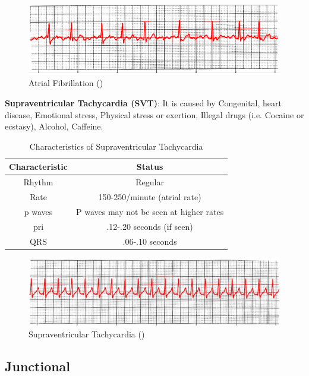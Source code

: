  \begin{figure}[H]
\centering
\includegraphics[scale=0.8]{img/AF.png}
\caption{Atrial Fibrillation (\cite{arryth_types})}
\label{fig:AF}
\end{figure}

\textbf{Supraventricular Tachycardia (SVT)}: It is caused by Congenital, heart disease, Emotional stress, Physical stress or exertion, Illegal drugs (i.e. Cocaine or ecstasy), Alcohol, Caffeine.

\begin{table}[H]
\begin{center}
\begin{tabular}{||c || c||}
 \hline
\textbf{Characteristic} & \textbf{Status} \\ [0.4ex] 
 \hline\hline
 Rhythm & Regular \\
\hline
Rate & 150-250/minute (atrial rate)\\
\hline
p waves & P waves may not be seen at higher rates \\
\hline
pri & .12-.20 seconds (if seen) \\
\hline
QRS & .06-.10 seconds \\
\hline\hline
\end{tabular}
\end{center}
\caption{Characteristics of Supraventricular Tachycardia}
\label{table:SVT_characteristics}
\end{table}

 \begin{figure}[H]
\centering
\includegraphics[scale=0.9]{img/SVT.png}
\caption{Supraventricular Tachycardia (\cite{arryth_types})}
\label{fig:SVT}
\end{figure}

\subsection{Junctional}

